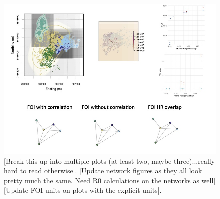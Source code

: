 \documentclass[letterpaper]{article}
\begin{document}
\begin{figure}
     \includegraphics[width=\textwidth]{figures/deer_results.jpg}
    \caption{[Break this up into multiple plots (at least two, maybe three)...really hard to read otherwise]. [Update network figures as they all look pretty much the same.  Need R0 calculations on the networks as well] [Update FOI units on plots with the explicit units].}
	\label{fig:empiricalres}
\end{figure}

\clearpage


\end{document}
